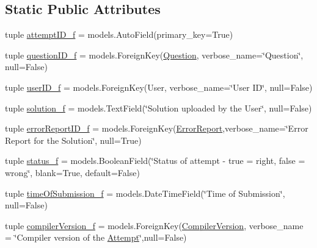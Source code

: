 \subsection*{Static Public Attributes}
\begin{DoxyCompactItemize}
\item 
tuple \hyperlink{class_ecodena_1_1_attempt_1_1models_1_1_attempt_ac5cbf660353ba1658687b993929d0cbd}{attemptID\_\-f} = models.AutoField(primary\_\-key=True)
\item 
tuple \hyperlink{class_ecodena_1_1_attempt_1_1models_1_1_attempt_acbd8a4ec39ee2520f9540c23bf78982b}{questionID\_\-f} = models.ForeignKey(\hyperlink{class_ecodena_1_1_question_1_1models_1_1_question}{Question}, verbose\_\-name=\char`\"{}Question\char`\"{}, null=False)
\item 
tuple \hyperlink{class_ecodena_1_1_attempt_1_1models_1_1_attempt_ac1f50e1b0c5ccfc3e16fff6b5069c01e}{userID\_\-f} = models.ForeignKey(User, verbose\_\-name=\char`\"{}User ID\char`\"{}, null=False)
\item 
tuple \hyperlink{class_ecodena_1_1_attempt_1_1models_1_1_attempt_a1b63280fe142dfde79c43df974cf42dd}{solution\_\-f} = models.TextField(\char`\"{}Solution uploaded by the User\char`\"{}, null=False)
\item 
tuple \hyperlink{class_ecodena_1_1_attempt_1_1models_1_1_attempt_ae2cd37972f3706554532bf2e958c5b7d}{errorReportID\_\-f} = models.ForeignKey(\hyperlink{class_ecodena_1_1_attempt_1_1models_1_1_error_report}{ErrorReport},verbose\_\-name=\char`\"{}Error Report for the Solution\char`\"{}, null=True)
\item 
tuple \hyperlink{class_ecodena_1_1_attempt_1_1models_1_1_attempt_a59ab4c46b6d8e82311f400a9f86398f3}{status\_\-f} = models.BooleanField(\char`\"{}Status of attempt -\/ true = right, false = wrong\char`\"{}, blank=True, default=False)
\item 
tuple \hyperlink{class_ecodena_1_1_attempt_1_1models_1_1_attempt_ae384b3bf053f841002aa0232bccfafaa}{timeOfSubmission\_\-f} = models.DateTimeField(\char`\"{}Time of Submission\char`\"{}, null=False)
\item 
tuple \hyperlink{class_ecodena_1_1_attempt_1_1models_1_1_attempt_a42ceae67abfdaa990cdd49c8acb16c1f}{compilerVersion\_\-f} = models.ForeignKey(\hyperlink{class_ecodena_1_1_compiler_1_1models_1_1_compiler_version}{CompilerVersion}, verbose\_\-name = \char`\"{}Compiler version of the \hyperlink{class_ecodena_1_1_attempt_1_1models_1_1_attempt}{Attempt}\char`\"{},null=False)
\end{DoxyCompactItemize}
